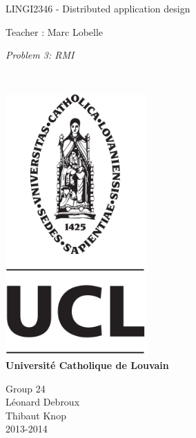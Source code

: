 \documentclass{article}
\begin{document}
\begin{titlepage}
    \begin{center}
        {\huge LINGI2346 - Distributed application design}\\
        \vspace{0.4cm}
        
        {\Large {Teacher : Marc Lobelle}}\\
        \vspace{0.6cm}
        
        {\Large \textit{Problem 3: RMI}}\\
        \vspace{1.2cm}

        \texttt{}\\
        \vspace{0.2cm}

        \includegraphics[height=10cm]{pageGarde.png}\\
        \vspace{0.1cm}
        {\Large \textbf{Universit\'e Catholique de Louvain}}
        \vspace{0.3cm}

        \vspace{2cm}
        Group 24\\
        \vspace{0.3cm}
        Léonard Debroux\\
        Thibaut Knop\\
        \vspace{0.4cm}
        2013-2014\\
    \end{center}
\end{titlepage}
\end{document}
